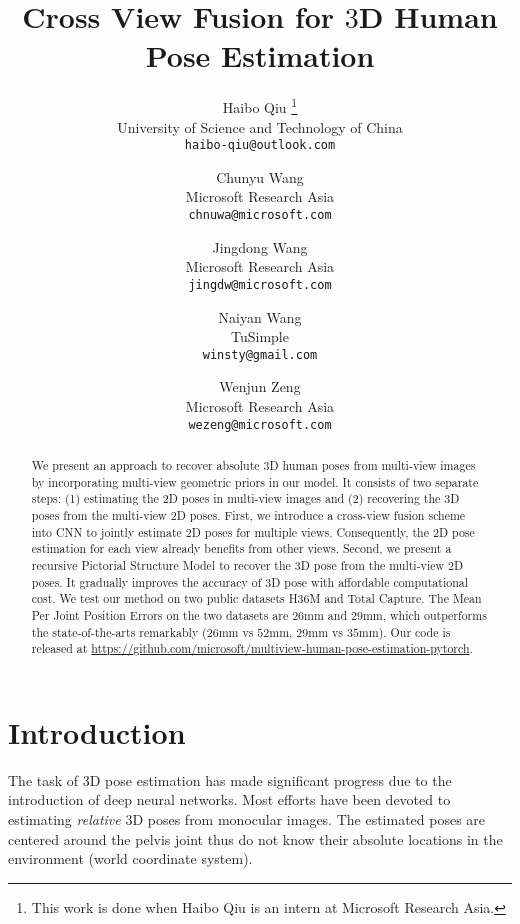 \documentclass[10pt,twocolumn,letterpaper]{article}
\begin{document}
\title{Cross View Fusion for $3$D Human Pose Estimation}

\author{Haibo Qiu \thanks{This work is done when Haibo Qiu is an intern at Microsoft Research Asia.}\\
University of Science and Technology of China\\
{\tt\small haibo-qiu@outlook.com}
\and
Chunyu Wang\\
Microsoft Research Asia\\
{\tt\small chnuwa@microsoft.com}
\and
Jingdong Wang\\
Microsoft Research Asia\\
{\tt\small jingdw@microsoft.com}
\and
Naiyan Wang\\
TuSimple\\
{\tt\small winsty@gmail.com}
\and
Wenjun Zeng\\
Microsoft Research Asia\\
{\tt\small wezeng@microsoft.com}
}

\maketitle



\begin{abstract}
We present an approach to recover absolute $3$D human poses from multi-view images by incorporating multi-view geometric priors in our model. It consists of two separate steps: (1) estimating the $2$D poses in multi-view images and (2) recovering the $3$D poses from the multi-view $2$D poses.
First,
we introduce a cross-view fusion scheme into CNN to jointly estimate $2$D poses for multiple views.
Consequently, the $2$D pose estimation for each view already benefits from other views.
Second,
we present a recursive Pictorial Structure Model to recover the $3$D pose from the multi-view $2$D poses.
It gradually improves the accuracy of $3$D pose with affordable computational cost.
We test our method on two public datasets H36M and Total Capture. The Mean Per Joint Position Errors on the two datasets are $26$mm and $29$mm, which outperforms the state-of-the-arts remarkably ($26$mm vs $52$mm, $29$mm vs $35$mm). Our code is released at \url{https://github.com/microsoft/multiview-human-pose-estimation-pytorch}.
\end{abstract}



\section{Introduction}
The task of $3$D pose estimation has made significant progress due to the introduction of deep neural networks. Most efforts \cite{martinez2017simple, kanazawa2018end,zhou2017towards,pavlakos2017coarse,tome2017lifting,Rhodin_2018_ECCV,wang2014robust,wang2018robust,lcn2019} have been devoted to estimating \textit{relative} $3$D poses from monocular images. The estimated poses are centered around the pelvis joint thus do not know their absolute locations in the environment (world coordinate system).
\end{document}
